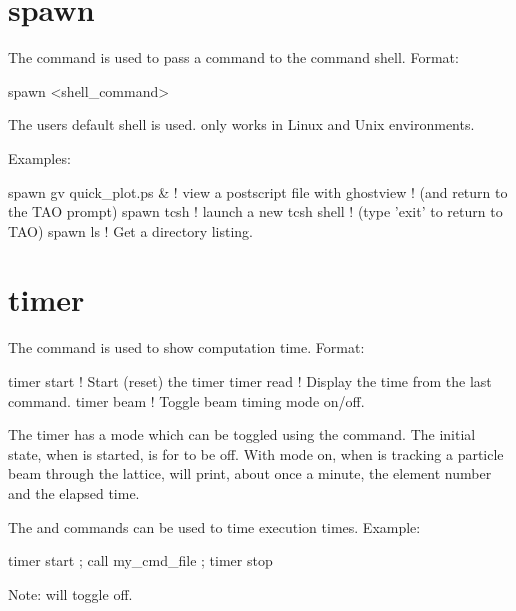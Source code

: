 {{{{{{%
\section{spawn}
\label{s:spawn}

The  command is used to pass a command to the command shell. Format:
\begin{example}
  spawn <shell_command>
\end{example}

The users default shell is used.  only works in Linux and Unix environments.

Examples:
\begin{example}
  spawn gv quick_plot.ps &      ! view a postscript file with ghostview
                                ! (and return to the TAO prompt)
  spawn tcsh                    ! launch a new tcsh shell 
                                ! (type 'exit' to return to TAO)
  spawn ls                      ! Get a directory listing.
\end{example}

\section{timer}
\label{s:timer}

The  command is used to show computation time. Format:
\begin{example}
  timer start      ! Start (reset) the timer
  timer read       ! Display the time from the last  command.    
  timer beam       ! Toggle beam timing mode on/off.
\end{example}
The timer has a  mode which can be toggled using the 
command. The initial state, when \tao is started, is for  to be off. With
 mode on, when \tao is tracking a particle beam through the lattice, \tao
will print, about once a minute, the element number and the elapsed time.

The  and  commands can be used to time execution
times. Example:
\begin{example}
  timer start ; call my_cmd_file ; timer stop
\end{example}

Note:  will toggle  off.

}}}}}}
